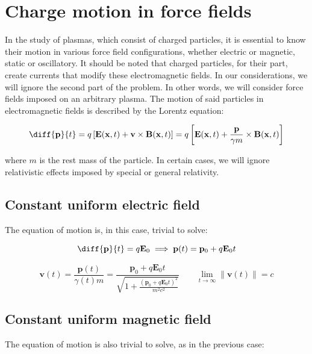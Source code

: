 \chapter{Charge motion in force fields}

In the study of plasmas, which consist of charged particles, it is essential to know their motion in various force field configurations, whether electric or magnetic, static or oscillatory. It should be noted that charged particles, for their part, create currents that modify these electromagnetic fields. In our considerations, we will ignore the second part of the problem. In other words, we will consider force fields imposed on an arbitrary plasma. The motion of said particles in electromagnetic fields is described by the Lorentz equation:

\begin{equation}
    \diff{\mathbf{p}}{t}=q\left[\mathbf{E}(\mathbf{x}, t)+\mathbf{v}\times\mathbf{B}(\mathbf{x}, t)\right]=q\left[\mathbf{E}(\mathbf{x},t)+\frac{\mathbf{p}}{\gamma m}\times\mathbf{B}(\mathbf{x},t)\right]
\end{equation}

where $m$ is the rest mass of the particle. In certain cases, we will ignore relativistic effects imposed by special or general relativity.

\section{Constant uniform electric field}

The equation of motion is, in this case, trivial to solve:

\begin{equation}
    \diff{\mathbf{p}}{t}=q\mathbf{E}_0\implies\mathbf{p}(t)=\mathbf{p}_0+q\mathbf{E}_0t
\end{equation}

\begin{equation}
    \mathbf{v}(t)=\frac{\mathbf{p}(t)}{\gamma(t)m}=\frac{\mathbf{p}_0+q\mathbf{E}_0t}{\sqrt{1+\frac{(\mathbf{p}_0+q\mathbf{E}_0t)^2}{m^2c^2}}}\quad\quad\lim_{t\to\infty}\|\mathbf{v}(t)\|=c
\end{equation}

\section{Constant uniform magnetic field}

\label{sec2-2}

The equation of motion is also trivial to solve, as in the previous case:

